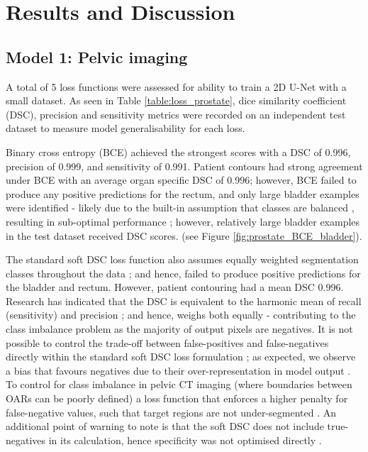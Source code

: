\chapter{Results and Discussion}
\label{ch:results}

\section{Model 1: Pelvic imaging}
A total of 5 loss functions were assessed for ability to train a 2D U-Net with a small dataset. As seen in Table \ref{table:loss_prostate}, dice similarity coefficient (DSC), precision and sensitivity metrics were recorded on an independent test dataset to measure model generalisability for each loss. 

Binary cross entropy (BCE) achieved the strongest scores with a DSC of 0.996, precision of 0.999, and sensitivity of 0.991. Patient contours had strong agreement under BCE with an average organ specific DSC of 0.996; however, BCE failed to produce any positive predictions for the rectum, and only large bladder examples were identified - likely due to the built-in assumption that classes are balanced \cite{Ronneberger_2015}, resulting in sub-optimal performance \cite{taghanaki2018}; however, relatively large bladder examples in the test dataset received DSC scores. (see Figure \ref{fig:prostate_BCE_bladder}).  

The standard soft DSC loss function also assumes equally weighted segmentation classes throughout the data \cite{Sudre_2017}; and hence, failed to produce positive predictions for the bladder and rectum. However, patient contouring had a mean DSC 0.996. Research has indicated that the DSC is equivalent to the harmonic mean of recall (sensitivity) and precision \cite{Bebis2019}; and hence, weighs both equally \cite{Bebis2019} - contributing to the class imbalance problem as the majority of output pixels are negatives. It is not possible to control the trade-off between false-positives and false-negatives directly within the standard soft DSC loss formulation \cite{taghanaki2018};
as expected, we observe a bias that favours negatives due to their over-representation in model output \cite{taghanaki2018}. To control for class imbalance in pelvic CT imaging (where boundaries between OARs can be poorly defined) a loss function that enforces a higher penalty for false-negative values, such that target regions are not under-segmented \cite{taghanaki2018}. An additional point of warning to note is that the soft DSC does not include true-negatives in its calculation, hence specificity was not optimised directly \cite{taghanaki2018}.

